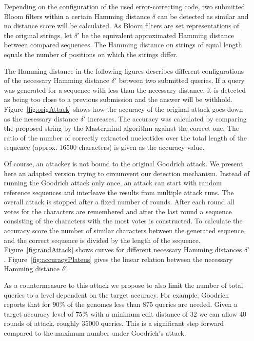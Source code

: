 \documentclass{llncs}
\begin{document}
Depending on the configuration of the used error-correcting code, two submitted Bloom filters within a certain
Hamming distance $\delta$ can be detected as similar and no distance score will be calculated.
As Bloom filters are set representations of the original strings, let $\delta'$ be the equivalent
approximated Hamming distance between compared sequences. The Hamming distance on strings of
equal length equals the number of positions on which the strings differ.

The Hamming distance in the following figures describes different configurations of the necessary Hamming distance $\delta'$ between two submitted queries.
If a query was generated for a sequence with less than the necessary distance, it is detected as being too close to a previous submission and the answer will be withhold.
Figure~\ref{fig:origAttack} shows how the accuracy of the original attack goes down as the nesessary distance $\delta'$ increases.
The accuracy was calculated by comparing the proposed string by the Mastermind algorithm against the correct one.
The ratio of the number of correctly extracted nucleotides over the total length of the sequence (approx. 16500 characters) is given as the accuracy value.

Of course, an attacker is not bound to the original Goodrich attack.
We present here an adapted version trying to circumvent our detection mechanism.
Instead of running the Goodrich attack only once, an attack can start with
random reference sequences and interleave the results from multiple attack runs.
The overall attack is stopped after a fixed number of rounds. After each round
all votes for the characters are remembered and after the last round a sequence
consisting of the characters with the most votes is constructed. To calculate
the accuracy score the number of similar characters between the generated
sequence and the correct sequence is divided by the length of the sequence.
Figure~\ref{fig:randAttack} shows curves for different necessary Hamming
distances $\delta'$. Figure~\ref{fig:accuracyPlateus} gives the linear relation between the necessary Hamming
distance $\delta'$. 

As a countermeasure to this attack we propose to also limit the number of total queries to a level dependent on the target accuracy.
For example, Goodrich reports that for $90\%$ of the genomes less than $875$ queries are needed.
Given a target accuracy level of $75\%$ with a minimum edit distance of $32$ we can allow $40$ rounds of attack, roughly $35000$ queries.
This is a significant step forward compared to the maximum number under Goodrich's attack.
\end{document}
